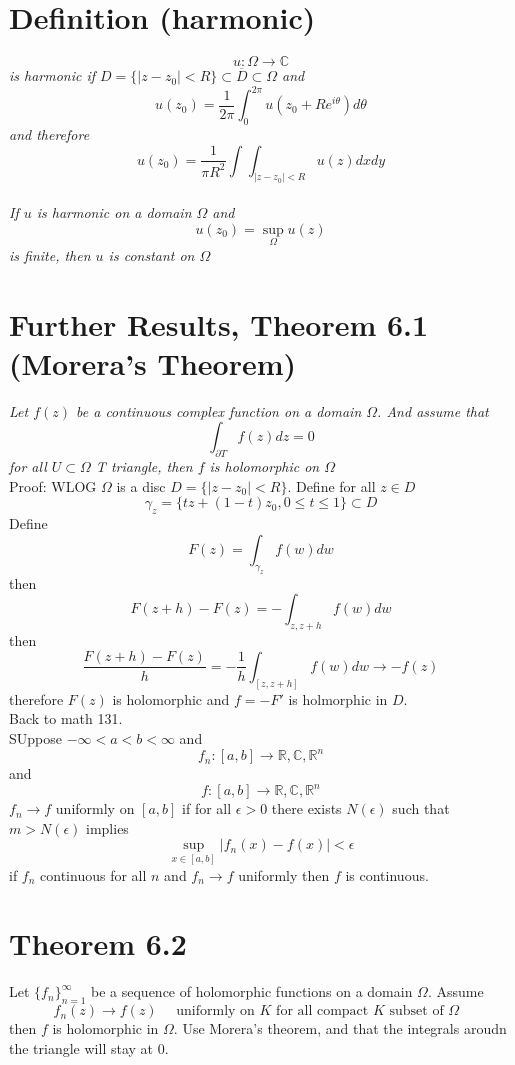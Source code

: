 \documentclass[11pt]{article}
\begin{document}
\section{Definition (harmonic)}
\emph{
    \[
    u : \Omega \rightarrow \mathbb{C}
    \] 
    is harmonic if $D = \{|z-z_0| < R\} \subset \overline{ D} \subset \Omega$ and
    \[
    u(z_0) = \frac{1}{2\pi}\int_{0}^{2\pi}u(z_0 + Re^{i \theta}) d \theta
    \] 
    and therefore
    \[
    u(z_0) = \frac{1}{\pi R^2} \int_{}^{}\int_{|z-z_0| < R}^{} u(z) dx dy
    \] \\
    If $u$ is harmonic on a domain  $\Omega$ and
     \[
         u(z_0) = \sup_{\Omega} u(z)
    \] 
    is finite, then $u$ is constant on  $\Omega$
}

\section{Further Results, Theorem 6.1 (Morera's Theorem)}
\emph{
    Let $f(z)$ be a continuous complex function on a domain  $\Omega$. And assume that
     \[
    \int_{\partial T}^{}f(z)dz =0
    \] 
    for all $U \subset \Omega$ T triangle, then $f$ is holomorphic on $\Omega$
}\\
Proof:  WLOG $\Omega$ is a disc  $D = \{|z-z_0| < R\}$. Define  for all $z \in D$
\[
    \gamma_z = \{tz + (1-t)z_0, 0 \le t \le 1\} \subset D
\] 
Define 
\[
F(z) = \int_{\gamma_z}^{}f(w) dw
\] 
then
\[
    F(z+h) - F(z) = -\int_{z,z+h}^{}f(w)dw
\] 
then
\[
    \frac{F(z+h) - F(z)}{h} = -\frac{1}{h}\int_{[z,z+h]}^{}f(w) dw \rightarrow -f(z)
\] 
therefore $F(z)$ is holomorphic and  $f = -F'$ is holmorphic in  $D$.
\\
Back to math 131.\\
SUppose  $-\infty < a < b < \infty$ and 
\[
    f_n : [a,b] \rightarrow \mathbb{R}, \mathbb{C}, \mathbb{R}^{n}
\] 
and
\[
    f : [a,b] \rightarrow \mathbb{R}, \mathbb{C}, \mathbb{R}^{n}
\] 
$f_n \rightarrow f$ uniformly on $[a,b]$ if for all $\epsilon > 0$ there exists $N(\epsilon)$ such that $m > N(\epsilon)$ implies
\[
    \sup_{x \in [a,b]} |f_n(x) - f(x)| < \epsilon
\] 
if $f_n$ continuous for all $n$ and $f_n \rightarrow f$ uniformly then $f$ is continuous.

\section{Theorem 6.2}
Let $\{f_n\}_{n=1}^{\infty}$ be a sequence of holomorphic functions on a domain $\Omega$. Assume 
 \[
     f_n(z) \rightarrow f(z) \quad \text{ uniformly on $K$ for all compact $K$ subset of $\Omega$ }
\] 
then $f$ is holomorphic in $\Omega$. Use  Morera's theorem, and that the integrals aroudn the triangle will stay at 0.
\end{document}
